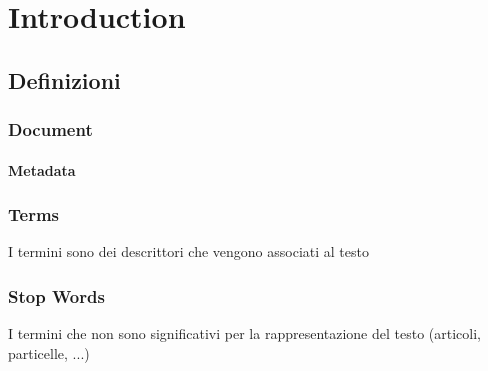 \chapter{Introduction}

\section{Definizioni}

\subsection{Document}

\subsubsection{Metadata}

\subsection{Terms}
I termini sono dei descrittori che vengono associati al testo

\subsection{Stop Words}
I termini che non sono significativi per la rappresentazione del testo (articoli, particelle, ...)

